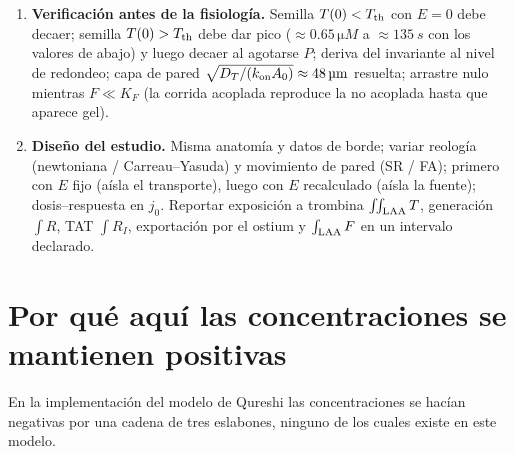 \documentclass[11pt,a4paper]{article}
\newcommand{\Pref}{P_{\rm ref}}
\begin{document}
\begin{enumerate}[leftmargin=1.6em]
\begin{enumerate}[leftmargin=1.4em]
\[
P^\ast=\frac{P}{1+\Delta t\big[k_a\frac{T^2}{(K_A+T)\Pref}+\frac{j_0\chi\tilde E}{\delta\Pref}\big]},\quad \Delta_P=P-P^\ast,\qquad
\Delta_I=\frac{2c}{b+\sqrt{b^2-4ac}},\ \ a=\Delta t\,k_{\rm on},\ b=1+a(A+T+\Delta_P),\ c=aA(T+\Delta_P),
\]
\[
T^\ast=T+\Delta_P-\Delta_I,\qquad A^\ast=A-\Delta_I,\qquad G^\ast=\frac{G}{1+\Delta t\,k_FT^\ast/(K_G+G)} .
\]
$\Delta_I$ es la raíz menor de $\Delta_I=\Delta t\,k_{\rm on}(A-\Delta_I)(T+\Delta_P-\Delta_I)$, de modo que todo queda $\ge0$, $P^\ast+T^\ast-A^\ast=P+T-A$ y la protrombina consumida es la trombina producida. Es \emph{splitting} de Lie: con transporte de primer orden, Strang no subiría el orden.
\item \emph{Diagnósticos y salida.} $F=G_0-G$, $I=A_0-A$, $\sigma_B$, deriva del invariante; máximos y mínimos al CSV; campos a XDMF cada $k$ pasos y al cierre de cada ciclo.
\end{enumerate}
\item \textbf{Verificación antes de la fisiología.} Semilla $T(0)<T_{\rm th}$ con $E=0$ debe decaer; semilla $T(0)>T_{\rm th}$ debe dar pico ($\approx0.65\,\si{\micro M}$ a $\approx\SI{135}{s}$ con los valores de abajo) y luego decaer al agotarse $P$; deriva del invariante al nivel de redondeo; capa de pared $\sqrt{D_T/(k_{\rm on}A_0)}\approx\SI{48}{\micro m}$ resuelta; arrastre nulo mientras $F\ll K_F$ (la corrida acoplada reproduce la no acoplada hasta que aparece gel).
\item \textbf{Diseño del estudio.} Misma anatomía y datos de borde; variar reología (newtoniana / Carreau--Yasuda) y movimiento de pared (SR / FA); primero con $E$ fijo (aísla el transporte), luego con $E$ recalculado (aísla la fuente); dosis--respuesta en $j_0$. Reportar exposición a trombina $\int\!\!\int_{\rm LAA}T$, generación $\int R$, TAT $\int R_I$, exportación por el ostium y $\int_{\rm LAA}F$ en un intervalo declarado.
\end{enumerate}

\section{Por qué aquí las concentraciones se mantienen positivas}

En la implementación del modelo de Qureshi las concentraciones se hacían negativas por una cadena de tres eslabones, ninguno de los cuales existe en este modelo.
\end{document}
